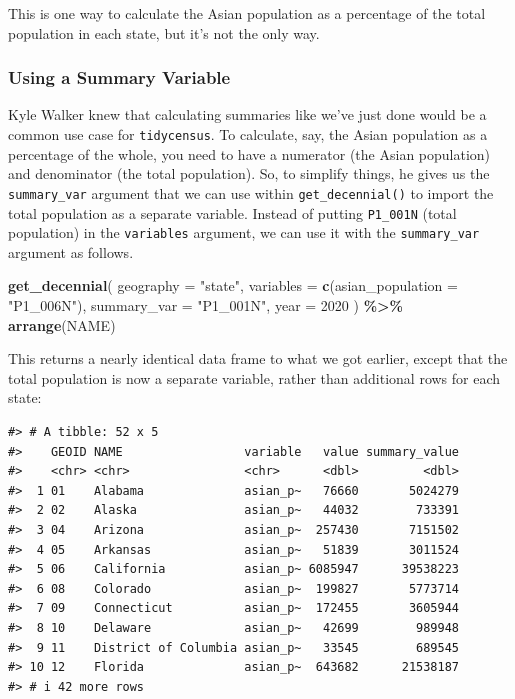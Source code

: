 \documentclass[
]{book}
\newenvironment{Shaded}{\begin{snugshade}}{\end{snugshade}}
\newcommand{\AttributeTok}[1]{\textcolor[rgb]{0.13,0.29,0.53}{#1}}
\newcommand{\DecValTok}[1]{\textcolor[rgb]{0.00,0.00,0.81}{#1}}
\newcommand{\FunctionTok}[1]{\textcolor[rgb]{0.13,0.29,0.53}{\textbf{#1}}}
\newcommand{\NormalTok}[1]{#1}
\newcommand{\SpecialCharTok}[1]{\textcolor[rgb]{0.81,0.36,0.00}{\textbf{#1}}}
\newcommand{\StringTok}[1]{\textcolor[rgb]{0.31,0.60,0.02}{#1}}
\begin{document}
This is one way to calculate the Asian population as a percentage of the total population in each state, but it's not the only way.

\hypertarget{using-a-summary-variable}{%
\subsubsection*{Using a Summary Variable}\label{using-a-summary-variable}}

Kyle Walker knew that calculating summaries like we've just done would be a common use case for \texttt{tidycensus}. To calculate, say, the Asian population as a percentage of the whole, you need to have a numerator (the Asian population) and denominator (the total population). So, to simplify things, he gives us the \texttt{summary\_var} argument that we can use within \texttt{get\_decennial()} to import the total population as a separate variable. Instead of putting \texttt{P1\_001N} (total population) in the \texttt{variables} argument, we can use it with the \texttt{summary\_var} argument as follows.

\begin{Shaded}
\begin{Highlighting}[]
\FunctionTok{get\_decennial}\NormalTok{(}
  \AttributeTok{geography =} \StringTok{"state"}\NormalTok{,}
  \AttributeTok{variables =} \FunctionTok{c}\NormalTok{(}\AttributeTok{asian\_population =} \StringTok{"P1\_006N"}\NormalTok{),}
  \AttributeTok{summary\_var =} \StringTok{"P1\_001N"}\NormalTok{,}
  \AttributeTok{year =} \DecValTok{2020}
\NormalTok{) }\SpecialCharTok{\%\textgreater{}\%}
  \FunctionTok{arrange}\NormalTok{(NAME)}
\end{Highlighting}
\end{Shaded}

This returns a nearly identical data frame to what we got earlier, except that the total population is now a separate variable, rather than additional rows for each state:

\begin{verbatim}
#> # A tibble: 52 x 5
#>    GEOID NAME                 variable   value summary_value
#>    <chr> <chr>                <chr>      <dbl>         <dbl>
#>  1 01    Alabama              asian_p~   76660       5024279
#>  2 02    Alaska               asian_p~   44032        733391
#>  3 04    Arizona              asian_p~  257430       7151502
#>  4 05    Arkansas             asian_p~   51839       3011524
#>  5 06    California           asian_p~ 6085947      39538223
#>  6 08    Colorado             asian_p~  199827       5773714
#>  7 09    Connecticut          asian_p~  172455       3605944
#>  8 10    Delaware             asian_p~   42699        989948
#>  9 11    District of Columbia asian_p~   33545        689545
#> 10 12    Florida              asian_p~  643682      21538187
#> # i 42 more rows
\end{verbatim}
\end{document}
